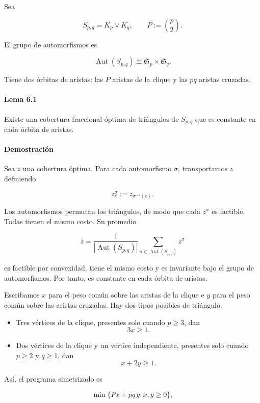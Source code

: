 \documentclass[
  spanish,
  11pt,
  a4paper,
]{article}
\providecommand{\tightlist}{%
  \setlength{\itemsep}{0pt}\setlength{\parskip}{0pt}}
\begin{document}
Sea

\[
S_{p,q}=K_p\vee\overline{K_q},
\qquad
P:=\binom p2.
\]

El grupo de automorfismos es

\[
\operatorname{Aut}(S_{p,q})
\cong
\mathfrak S_p\times\mathfrak S_q.
\]

Tiene dos órbitas de aristas: las \(P\) aristas de la clique y las \(pq\) aristas cruzadas.

\paragraph{Lema 6.1}\label{lema-6.1}

Existe una cobertura fraccional óptima de triángulos de \(S_{p,q}\) que es constante en cada órbita de aristas.

\paragraph{Demostración}\label{demostraciuxf3n-8}

Sea \(z\) una cobertura óptima. Para cada automorfismo \(\sigma\), transportamos \(z\) definiendo

\[
z^\sigma_e:=z_{\sigma^{-1}(e)}.
\]

Los automorfismos permutan los triángulos, de modo que cada \(z^\sigma\) es factible. Todas tienen el mismo costo. Su promedio

\[
\overline z
=
\frac{1}{|\operatorname{Aut}(S_{p,q})|}
\sum_{\sigma\in\operatorname{Aut}(S_{p,q})}z^\sigma
\]

es factible por convexidad, tiene el mismo costo y es invariante bajo el grupo de automorfismos. Por tanto, es constante en cada órbita de aristas.

Escribamos \(x\) para el peso común sobre las aristas de la clique e \(y\) para el peso común sobre las aristas cruzadas. Hay dos tipos posibles de triángulo.

\begin{itemize}
\tightlist
\item
  Tres vértices de la clique, presentes solo cuando \(p\ge3\), dan
  \[
  3x\ge1.
  \]
\item
  Dos vértices de la clique y un vértice independiente, presentes solo cuando \(p\ge2\) y \(q\ge1\), dan
  \[
  x+2y\ge1.
  \]
\end{itemize}

Así, el programa simetrizado es

\[
\min\{Px+pq\,y:x,y\ge0\},
\]
\end{document}
